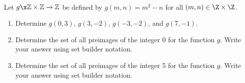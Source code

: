 \begin{prog} \label{pr:function-two} \hfill \\
Let $g\x \mathbb{Z} \times \mathbb{Z} \to \mathbb{Z}$ be defined by  
$g( {m, n} ) = m^2 - n$ for all $\left(m, n \right) \in \Z \times \Z$.

\begin{enumerate}
\item Determine $g(0, 3)$, $g(3,-2)$, $g(-3, -2)$, and $g(7, -1)$.
\item Determine the set of all preimages of the integer 0 for the function $g$.  Write your answer using set builder notation.
\item Determine the set of all preimages of the integer 5 for the function $g$.  Write your answer using set builder notation.
\end{enumerate}

\end{prog}
\hbreak


